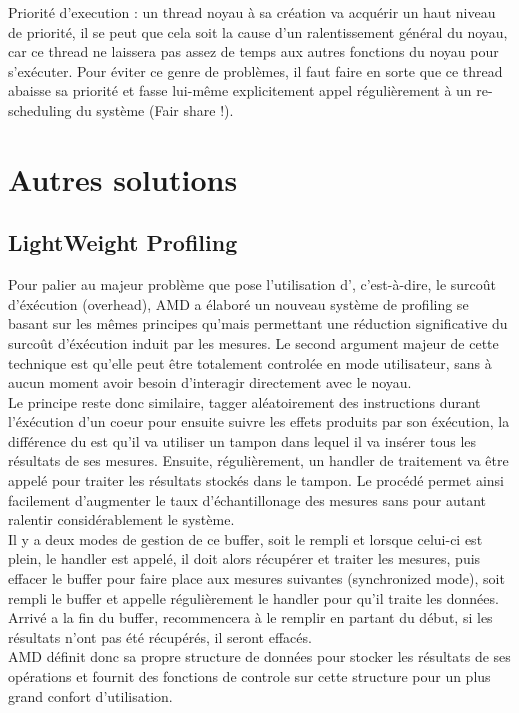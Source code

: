							\item{Priorité d'execution : un thread noyau à sa création va acquérir un haut niveau de priorité, il se peut que cela soit la cause d'un ralentissement général du noyau, car ce thread ne laissera pas assez de temps aux autres fonctions du noyau pour s'exécuter. Pour éviter ce genre de problèmes, il faut faire en sorte que ce thread abaisse sa priorité et fasse lui-même explicitement appel régulièrement à un re-scheduling du système (Fair share !).}
						\eitem
			\section{Autres solutions}
				\subsection{LightWeight Profiling}
					Pour palier au majeur problème que pose l'utilisation d'\IBS, c'est-à-dire, le surcoût d'éxécution (overhead), AMD a élaboré un nouveau système de profiling se basant sur les mêmes principes qu'\IBS mais permettant une réduction significative du surcoût d'éxécution induit par les mesures. Le second argument majeur de cette technique est qu'elle peut être totalement controlée en mode utilisateur, sans à aucun moment avoir besoin d'interagir directement avec le noyau.\\
					Le principe reste donc similaire, tagger aléatoirement des instructions durant l'éxécution d'un coeur pour ensuite suivre les effets produits par son éxécution, la différence du \lwp est qu'il va utiliser un tampon dans lequel il va insérer tous les résultats de ses mesures. Ensuite, régulièrement, un handler de traitement va être appelé pour traiter les résultats stockés dans le tampon. Le procédé permet ainsi facilement d'augmenter le taux d'échantillonage des mesures sans pour autant ralentir considérablement le système.\\
					Il y a deux modes de gestion de ce buffer, soit \lwp le rempli et lorsque celui-ci est plein, le handler est appelé, il doit alors récupérer et traiter les mesures, puis effacer le buffer pour faire place aux mesures suivantes (synchronized mode), soit \lwp rempli le buffer et appelle régulièrement le handler pour qu'il traite les données. Arrivé a la fin du buffer, \lwp recommencera à le remplir en partant du début, si les résultats n'ont pas été récupérés, il seront effacés.\\
					AMD définit donc sa propre structure de données pour stocker les résultats de ses opérations et fournit des fonctions de controle sur cette structure pour un plus grand confort d'utilisation.
